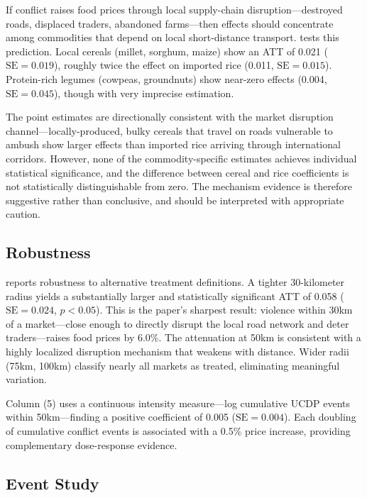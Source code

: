 \documentclass[12pt]{article}
\begin{document}


If conflict raises food prices through local supply-chain disruption---destroyed roads, displaced traders, abandoned farms---then effects should concentrate among commodities that depend on local short-distance transport.  tests this prediction. Local cereals (millet, sorghum, maize) show an ATT of 0.021 ($\text{SE} = 0.019$), roughly twice the effect on imported rice (0.011, $\text{SE} = 0.015$). Protein-rich legumes (cowpeas, groundnuts) show near-zero effects (0.004, $\text{SE} = 0.045$), though with very imprecise estimation.

The point estimates are directionally consistent with the market disruption channel---locally-produced, bulky cereals that travel on roads vulnerable to ambush show larger effects than imported rice arriving through international corridors. However, none of the commodity-specific estimates achieves individual statistical significance, and the difference between cereal and rice coefficients is not statistically distinguishable from zero. The mechanism evidence is therefore suggestive rather than conclusive, and should be interpreted with appropriate caution.

\subsection{Robustness}



 reports robustness to alternative treatment definitions. A tighter 30-kilometer radius yields a substantially larger and statistically significant ATT of 0.058 ($\text{SE} = 0.024$, $p < 0.05$). This is the paper's sharpest result: violence within 30km of a market---close enough to directly disrupt the local road network and deter traders---raises food prices by 6.0\%. The attenuation at 50km is consistent with a highly localized disruption mechanism that weakens with distance. Wider radii (75km, 100km) classify nearly all markets as treated, eliminating meaningful variation.

Column (5) uses a continuous intensity measure---log cumulative UCDP events within 50km---finding a positive coefficient of 0.005 ($\text{SE} = 0.004$). Each doubling of cumulative conflict events is associated with a 0.5\% price increase, providing complementary dose-response evidence.

\subsection{Event Study}
\end{document}
